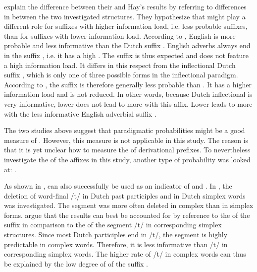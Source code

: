  \cite{Schuppler.2012} explain the difference between their and Hay's results by referring to differences in  between the two investigated structures. 
 They hypothesize that  might play a different role for suffixes with higher information load, i.e. less probable suffixes, than for suffixes with lower information load. According to \cite{Schuppler.2012}, English  is more probable and less informative than the Dutch suffix . 
 English adverbs always end in the suffix , i.e. it has a high . The suffix is thus expected and does not feature a high information load. It differs in this respect from the inflectional Dutch suffix , which is only one of three possible forms in the inflectional paradigm. According to \cite{Schuppler.2012}, the suffix  is therefore generally less probable than . It has a higher information load and is not reduced. In other words, because Dutch inflectional  is very informative, lower  does not lead to more  with this affix. Lower  leads to more  with the less informative English adverbial suffix  .
 
 
The two studies above suggest that paradigmatic probabilities might be a good measure of . However, this measure is not applicable in this study. The reason is that it is yet unclear how to measure the  of derivational prefixes. 
 To nevertheless investigate the  of the affixes in this study, 
another type of probability was looked at: . 

As shown in \cite{Hanique.06.03.2013},  can also successfully be used as an indicator of  and . In \cite{Hanique.06.03.2013}, the deletion of word-final /t/ in Dutch past participles and in Dutch simplex words was investigated.  The segment was more often deleted in complex than in simplex forms. 
  \cite{Hanique.2012}  argue that the results can best be accounted for by reference to the  of the suffix  in comparison to the  of the segment /t/ in corresponding simplex structures. Since most Dutch participles end in /t/, the segment is highly predictable in complex words. Therefore, it is less informative than /t/ in corresponding simplex words. The higher  rate of /t/ in complex words can thus be explained by the low degree of  of the suffix .
  
